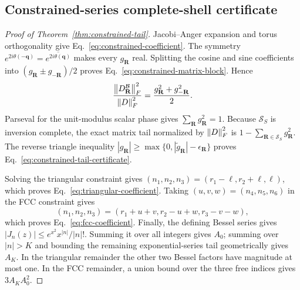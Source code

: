 \subsection{Constrained-series complete-shell certificate}
\label{app:proof-constrained-tail}

\begin{proof}[Proof of Theorem~\ref{thm:constrained-tail}]
Jacobi--Anger expansion and torus orthogonality give
Eq.~\eqref{eq:constrained-coefficient}. The symmetry
$e^{2i\theta(-\mathbf q)}=\overline{e^{2i\theta(\mathbf q)}}$ makes every
$g_{\mathbf R}$ real. Splitting the cosine and sine coefficients into
$(g_{\mathbf R}\pm g_{-\mathbf R})/2$ proves
Eq.~\eqref{eq:constrained-matrix-block}. Hence
\begin{equation}
 \frac{\left\lVert D_{\mathbf R}^{\mathcal B}\right\rVert_F^2}{\left\lVert D\right\rVert_F^2}
 =\frac{g_{\mathbf R}^2+g_{-\mathbf R}^2}{2}.
\end{equation}
Parseval for the unit-modulus scalar phase gives
$\sum_{\mathbf R}g_{\mathbf R}^2=1$. Because $\mathcal S_S$ is inversion complete,
the exact matrix tail normalized by $\left\lVert D\right\rVert_F^2$ is
$1-\sum_{\mathbf R\in\mathcal S_S}g_{\mathbf R}^2$. The reverse triangle inequality
$|g_{\mathbf R}|\ge\max\{0,|\widetilde g_{\mathbf R}|-\epsilon_{\mathbf R}\}$
proves Eq.~\eqref{eq:constrained-tail-certificate}.

Solving the triangular constraint gives
$(n_1,n_2,n_3)=(r_1-\ell,r_2+\ell,\ell)$, which proves
Eq.~\eqref{eq:triangular-coefficient}. Taking
$(u,v,w)=(n_4,n_5,n_6)$ in the FCC constraint gives
\begin{equation}
 (n_1,n_2,n_3)=(r_1+u+v,r_2-u+w,r_3-v-w),
\end{equation}
which proves Eq.~\eqref{eq:fcc-coefficient}. Finally, the defining Bessel series gives
$|J_n(z)|\le e^{x^2}x^{|n|}/|n|!$. Summing it over all integers gives $A_0$; summing
over $|n|>K$ and bounding the remaining exponential-series tail geometrically gives
$A_K$. In the triangular remainder the other two Bessel factors have magnitude at most
one. In the FCC remainder, a union bound over the three free indices gives
$3A_KA_0^2$.
\end{proof}
